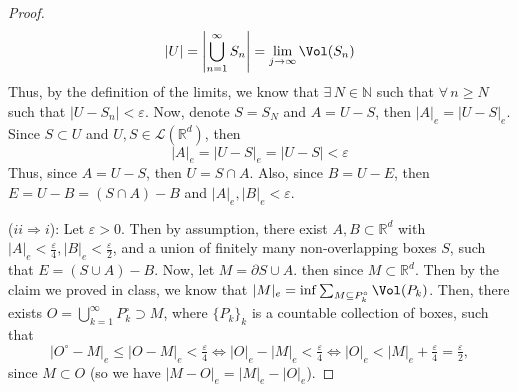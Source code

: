 \begin{answer}
\begin{proof}
\begin{equation}
            \lvert U \rvert = \left\lvert \bigcup_{n = 1}^{\infty} S_n \right\rvert = \lim_{j \to \infty} \Vol (S_n)
        \end{equation}
        Thus, by the definition of the limits, we know that $\exists \, N \in \mathbb{N}$ such that $\forall\, n \geq N$ such that $\lvert U - S_n \rvert < \varepsilon$. Now, denote $S = S_N$ and $A = U - S$, then $\lvert A \rvert_e = \lvert U - S\rvert_e $. Since $S \subset U$ and $U, S \in \mathcal{L}(\mathbb{R}^d)$, then
        \begin{equation}
            \lvert A \rvert_e = \lvert U - S \rvert_e = \lvert U - S\rvert < \varepsilon
        \end{equation}
        Thus, since $A = U - S$, then $U = S \cap A$. Also, since $B = U - E$, then $E = U - B = (S\cap A)-B$ and $\lvert A \rvert_e , \lvert B \rvert_e < \varepsilon$.
        
        ($ii\Rightarrow i$): Let $\varepsilon > 0$. Then by assumption, there exist $A,B \subset \mathbb{R}^d$ with $\lvert A \rvert_e < \tfrac{\varepsilon}{4}, \lvert B \rvert_e < \tfrac{\varepsilon}{2}$, and a union of finitely many non-overlapping boxes $S$, such that $E = (S \cup A) - B$. Now, let $M = \partial S \cup A$. then since $M \subset \mathbb{R}^d$. Then by the claim we proved in class,  we know that $\lvert M \rvert_e = \inf \sum_{M \subseteq P_k^{\circ}}\Vol(P_k)$. Then, there exists $O = \bigcup_{k=1}^{\infty}P_k^{\circ} \supset M$, where $\{P_k\}_k$ is a countable collection of boxes, such that
        \begin{equation}
            \lvert O^{\circ} - M \rvert_e \leq \lvert O - M \rvert_e < \tfrac{\varepsilon}{4} \Leftrightarrow \lvert O \rvert_e - \lvert M \rvert_e < \tfrac{\varepsilon}{4} \Leftrightarrow \lvert O \rvert_e < \lvert M \rvert_e + \tfrac{\varepsilon}{4} = \tfrac{\varepsilon}{2},
        \end{equation}
        since $M \subset O$ (so we have $\lvert M - O \rvert_e = \lvert M \rvert_e - \lvert O \rvert_e$).
        

\end{proof}
\end{answer}
